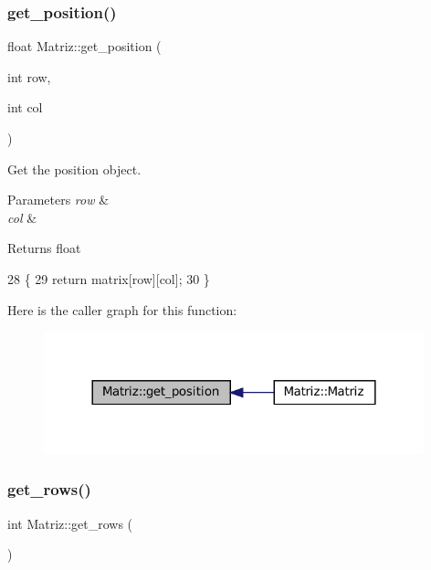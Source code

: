 \subsubsection{\texorpdfstring{get\+\_\+position()}{get\_position()}}
{\footnotesize\ttfamily float Matriz\+::get\+\_\+position (\begin{DoxyParamCaption}\item[{int}]{row,  }\item[{int}]{col }\end{DoxyParamCaption})}



Get the position object. 


\begin{DoxyParams}{Parameters}
{\em row} & \\
\hline
{\em col} & \\
\hline
\end{DoxyParams}
\begin{DoxyReturn}{Returns}
float 
\end{DoxyReturn}

\begin{DoxyCode}
28 \{
29   \textcolor{keywordflow}{return} matrix[row][col];
30 \}
\end{DoxyCode}
Here is the caller graph for this function\+:
\nopagebreak
\begin{figure}[H]
\begin{center}
\leavevmode
\includegraphics[width=312pt]{classMatriz_aaf1b9c3af2d3b269cc0a2dda08aebd61_icgraph}
\end{center}
\end{figure}
\mbox{\label{classMatriz_a6b18342f8c083baece693ff41185a206}} 
\subsubsection{\texorpdfstring{get\+\_\+rows()}{get\_rows()}}
{\footnotesize\ttfamily int Matriz\+::get\+\_\+rows (\begin{DoxyParamCaption}{ }\end{DoxyParamCaption})}



